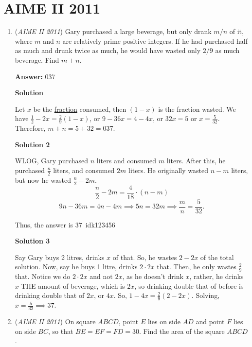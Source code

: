 \section{AIME II 2011}
        \begin{enumerate}
        	\item (\textit{AIME II 2011}) Gary purchased a large beverage, but only drank $m/n$ of it, where $m$ and $n$ are relatively prime positive integers. If he had purchased half as much and drunk twice as much, he would have wasted only $2/9$ as much beverage. Find $m+n$.


 
 \textbf{Answer: }037



\textbf{Solution}

Let $x$ be the \href{https://artofproblemsolving.com/wiki/index.php?title=Fraction}{fraction} consumed, then $(1-x)$ is the fraction wasted. We have $\frac{1}{2} - 2x =\frac{2}{9} (1-x)$, or $9 - 36x = 4 - 4x$, or $32x = 5$ or $x = \frac{5}{32}$. Therefore, $m + n = 5 + 32 = \boxed{037}$.

 



\textbf{Solution 2}


 WLOG, Gary purchased \( n \) liters and consumed \( m \) liters.   After this, he purchased \( \frac{n}{2} \) liters, and consumed \( 2m \) liters.   He originally wasted \( n-m \) liters, but now he wasted \( \frac{n}{2} - 2m \).   \[ \frac{n}{2} - 2m = \frac{4}{18} \cdot (n-m) \] \[ 9n - 36m = 4n - 4m \implies 5n = 32m \implies \frac{m}{n} = \frac{5}{32}. \]

 Thus, the answer is $\boxed{37}$~idk123456

 



\textbf{Solution 3}

Say Gary buys 2 litres, drinks $x$ of that. So, he wastes $2-2x$ of the total solution. Now, say he buys 1 litre, drinks $2 \cdot 2x$ that. Then, he only wastes $\frac{2}{9}$ that. Notice we do $2 \cdot 2x$ and not $2x$, as he doesn't drink $x$, rather, he drinks $x$ THE amount of beverage, which is $2x$, so drinking double that of before is drinking double that of $2x$, or $4x$. So, $1-4x = \frac{2}{9}(2-2x)$. Solving, $x  = \frac{5}{32} \implies \boxed{37}$.

 


	\item (\textit{AIME II 2011}) On square $ABCD$, point $E$ lies on side $AD$ and point $F$ lies on side $BC$, so that $BE=EF=FD=30$. Find the area of the square $ABCD$.



\end{enumerate}

